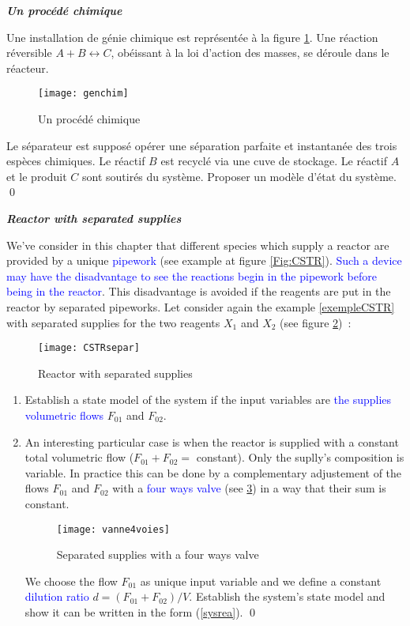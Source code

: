 \begin{exercice}{\bf \em Un procédé chimique}

Une installation de génie chimique est représentée à la figure
\ref{Fig:genchim}. Une réaction réversible $A+B \leftrightarrow C$, obéissant
à la loi d'action des masses, se déroule dans le réacteur.
\begin{figure}[htbp] 
   \centering
   \texttt{[image: genchim]} 
   \caption{Un procédé chimique}
   \label{Fig:genchim}
\end{figure}
 Le séparateur est
supposé opérer une séparation parfaite et instantanée des trois
espèces chimiques. Le réactif $B$ est recyclé via une cuve de
stockage. Le réactif $A$ et le produit $C$ sont soutirés du système.
Proposer un modèle d'état du système. \qed
\end{exercice}
\vv

\begin{exercice}{\bf \em Reactor with separated supplies}

We've consider in this chapter that different species which supply a reactor are provided by a unique \textcolor{blue}{pipework} (see example at figure \ref{Fig:CSTR}). \textcolor{blue}{Such a device may have the disadvantage to see the reactions begin in the pipework before being in the reactor}. This disadvantage is avoided if the reagents are put in the reactor by separated pipeworks. Let consider again the example \ref{exempleCSTR} with separated supplies for the two reagents $X_1$ and $X_2$ (see figure \ref{Fig:CSTRsepar})~:
\begin{figure}[htbp] 
  \centering
   \texttt{[image: CSTRsepar]} 
   \caption{Reactor with separated supplies}
   \label{Fig:CSTRsepar}
\end{figure}
\begin{enumerate}
\item Establish a state model of the system if the input variables are \textcolor{blue}{the supplies volumetric flows} $F_{01}$ and $F_{02}$.
\item An interesting particular case is when the reactor is supplied with a constant total volumetric flow ($F_{01} + F_{02} =$ constant).
Only the suplly's composition is variable. In practice this can be done by a complementary adjustement of the flows $F_{01}$ and $F_{02}$
with a \textcolor{blue}{four ways valve} (see \ref{Fig:vanne4voies}) in a way that their sum is constant.  
\begin{figure}[htbp] 
   \centering
   \texttt{[image: vanne4voies]} 
   \caption{Separated supplies with a four ways valve}
   \label{Fig:vanne4voies}
\end{figure}
We choose the flow $F_{01}$
as unique input variable and we define a constant \textcolor{blue}{dilution ratio} $d =
(F_{01} + F_{02})/V$. Establish the system's state model and show it can be written in the form (\ref{sysrea}). \qed
\end{enumerate}
\end{exercice}
\vv

